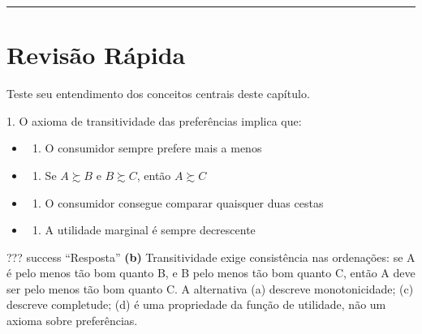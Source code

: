 \documentclass[11pt,twoside,openright]{book}
\providecommand{\tightlist}{\setlength{\itemsep}{0pt}\setlength{\parskip}{0pt}}
\begin{document}
\begin{center}\rule{0.5\linewidth}{0.5pt}\end{center}

\section{Revisão Rápida}\label{revisuxe3o-ruxe1pida}

Teste seu entendimento dos conceitos centrais deste capítulo.

\begin{infobox}{1. O axioma de transitividade das preferências implica que:}

\begin{itemize}
\tightlist
\item
  \begin{enumerate}
  \def\labelenumi{(\alph{enumi})}
  \tightlist
  \item
    O consumidor sempre prefere mais a menos
  \end{enumerate}
\item
  \begin{enumerate}
  \def\labelenumi{(\alph{enumi})}
  \setcounter{enumi}{1}
  \tightlist
  \item
    Se \(A \succsim B\) e \(B \succsim C\), então \(A \succsim C\)
  \end{enumerate}
\item
  \begin{enumerate}
  \def\labelenumi{(\alph{enumi})}
  \setcounter{enumi}{2}
  \tightlist
  \item
    O consumidor consegue comparar quaisquer duas cestas
  \end{enumerate}
\item
  \begin{enumerate}
  \def\labelenumi{(\alph{enumi})}
  \setcounter{enumi}{3}
  \tightlist
  \item
    A utilidade marginal é sempre decrescente
  \end{enumerate}
\end{itemize}

??? success ``Resposta'' \textbf{(b)} Transitividade exige consistência
nas ordenações: se A é pelo menos tão bom quanto B, e B pelo menos tão
bom quanto C, então A deve ser pelo menos tão bom quanto C. A
alternativa (a) descreve monotonicidade; (c) descreve completude; (d) é
uma propriedade da função de utilidade, não um axioma sobre
preferências.

\end{infobox}
\end{document}
